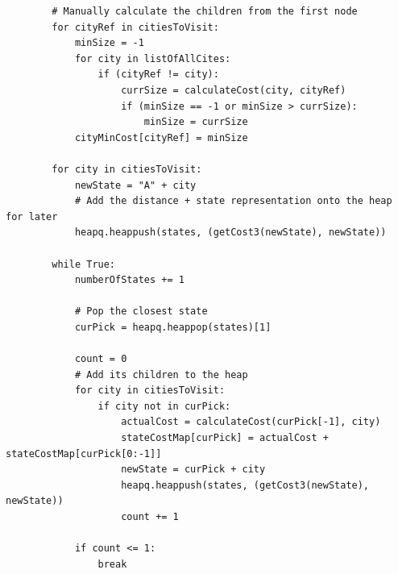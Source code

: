 \documentclass{article}
\begin{document}
\begin{titlepage}
\begin{lstlisting}
        # Manually calculate the children from the first node
        for cityRef in citiesToVisit:
            minSize = -1
            for city in listOfAllCites:
                if (cityRef != city):
                    currSize = calculateCost(city, cityRef)
                    if (minSize == -1 or minSize > currSize):
                        minSize = currSize
            cityMinCost[cityRef] = minSize

        for city in citiesToVisit:
            newState = "A" + city
            # Add the distance + state representation onto the heap for later
            heapq.heappush(states, (getCost3(newState), newState))

        while True:
            numberOfStates += 1

            # Pop the closest state
            curPick = heapq.heappop(states)[1]

            count = 0
            # Add its children to the heap
            for city in citiesToVisit:
                if city not in curPick:
                    actualCost = calculateCost(curPick[-1], city)
                    stateCostMap[curPick] = actualCost + stateCostMap[curPick[0:-1]]
                    newState = curPick + city
                    heapq.heappush(states, (getCost3(newState), newState))
                    count += 1

            if count <= 1:
                break


\end{lstlisting}
\end{titlepage}
\end{document}

